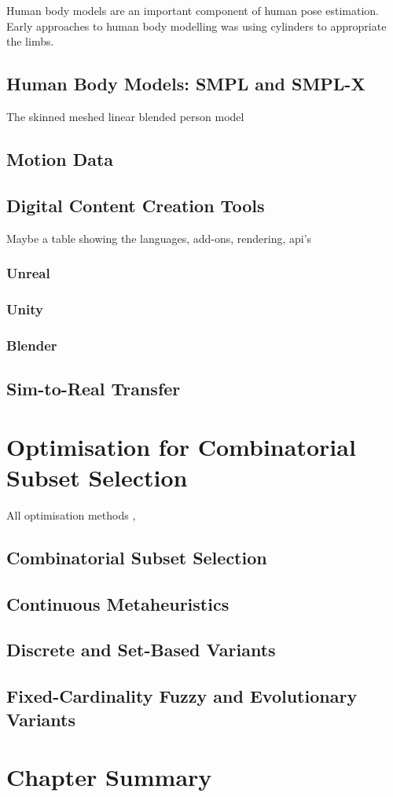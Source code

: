 Human body models are an important component of human pose estimation. 
Early approaches to human body modelling was using cylinders to appropriate the limbs.

\subsection{Human Body Models: SMPL and SMPL-X}
The skinned meshed linear blended person model
\cite{loper2015smpl}
\cite{SMPL-X:2019}
\cite{bregier2026human}

\subsection{Motion Data}
\cite{mahmood2019amass}
\cite{ghorbani2021soma}

\subsection{Digital Content Creation Tools}
Maybe a table showing the languages, add-ons, rendering, api's
\subsubsection{Unreal}
\subsubsection{Unity}
\subsubsection{Blender}

\subsection{Sim-to-Real Transfer}

\section{Optimisation for Combinatorial Subset Selection}
All optimisation methods
 \cite{jorgensen2018simulation} \cite{olague2002optimal} \cite{zhao2013approximate}, \cite{rahimian2016optimal}

\subsection{Combinatorial Subset Selection}

\subsection{Continuous Metaheuristics}
 \cite{eberhart1995particle}
 \cite{storn1997differential}

\subsection{Discrete and Set-Based Variants}
\cite{van2023set}
\cite{langeveld2015set}

\subsection{Fixed-Cardinality Fuzzy and Evolutionary Variants}
\cite{khan2012fuzzy}
\cite{mohiuddin2016fuzzy}

\section{Chapter Summary}
